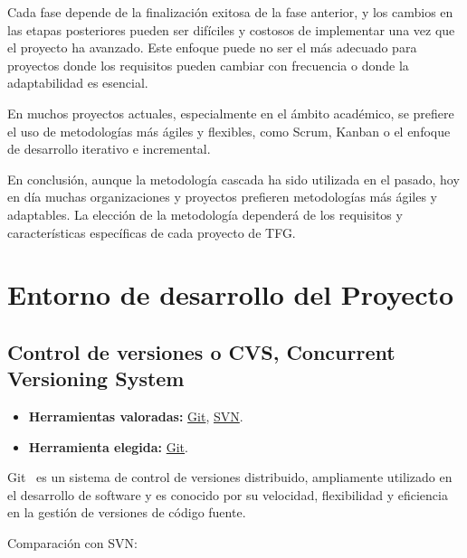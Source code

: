 Cada fase depende de la finalización exitosa de la fase anterior, y los cambios en las etapas posteriores pueden ser difíciles y costosos de implementar una vez que el proyecto ha avanzado. Este enfoque puede no ser el más adecuado para proyectos donde los requisitos pueden cambiar con frecuencia o donde la adaptabilidad es esencial.

En muchos proyectos actuales, especialmente en el ámbito académico, se prefiere el uso de metodologías más ágiles y flexibles, como Scrum, Kanban o el enfoque de desarrollo iterativo e incremental.

En conclusión, aunque la metodología cascada ha sido utilizada en el pasado, hoy en día muchas organizaciones y proyectos prefieren metodologías más ágiles y adaptables. La elección de la metodología dependerá de los requisitos y características específicas de cada proyecto de TFG.

\section{Entorno de desarrollo del Proyecto}
\subsection{Control de versiones o CVS, Concurrent Versioning System}\label{4:controlVersiones}
\begin{itemize}
    \item \textbf{Herramientas valoradas:} \href{https://git-scm.com/}{Git}, \href{https://subversion.apache.org/}{SVN}.
    \item \textbf{Herramienta elegida:} \href{https://git-scm.com/}{Git}.
\end{itemize}
Git~\cite{misc:Git} es un sistema de control de versiones distribuido, ampliamente utilizado en el desarrollo de software y es conocido por su velocidad, flexibilidad y eficiencia en la gestión de versiones de código fuente.

Comparación con SVN:

